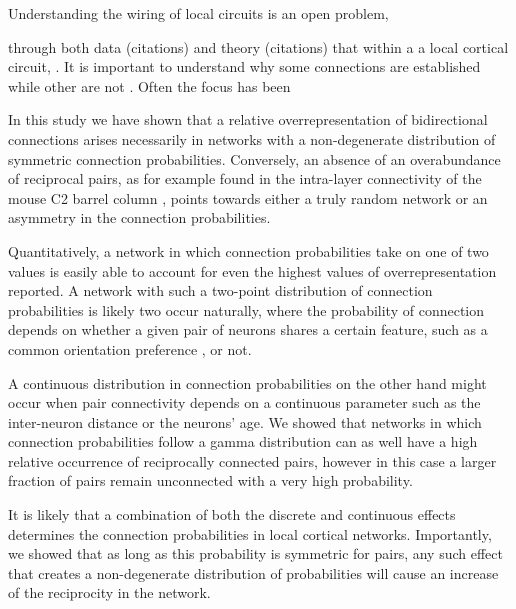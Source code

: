 
Understanding the wiring of local circuits is an open problem, 

through both data (citations) and theory (citations) that within a a local cortical circuit, . It is important to understand why some connections are established while other are not . Often the focus has been 
        
In this study we have shown that a relative overrepresentation of bidirectional connections arises necessarily in networks with a non-degenerate distribution of symmetric connection probabilities.
%
Conversely, an absence of an overabundance of reciprocal pairs, as for example found in the intra-layer connectivity of the mouse C2 barrel column \cite{Lefort2009}, points towards either a truly random network or an asymmetry in the connection probabilities. 


Quantitatively, a network in which connection probabilities take on one of two values is easily able to account for even the highest values of overrepresentation reported.
%
A network with such a two-point distribution of connection probabilities is likely two occur naturally, where the probability of connection depends on whether a given pair of neurons shares a certain feature, such as a common orientation preference \cite{Lee2016}, or not. 


A continuous distribution in connection probabilities on the other hand might occur when pair connectivity depends on a continuous parameter such as the inter-neuron distance or the neurons' age.
%
We showed that networks in which connection probabilities follow a gamma distribution can as well have a high relative occurrence of reciprocally connected pairs, however in this case a larger fraction of pairs remain unconnected with a very high probability.


It is likely that a combination of both the discrete and continuous effects determines the connection probabilities in local cortical networks.
%
Importantly, we showed that as long as this probability is symmetric for pairs, any such effect that creates a non-degenerate distribution of probabilities will cause an increase of the reciprocity in the network.

